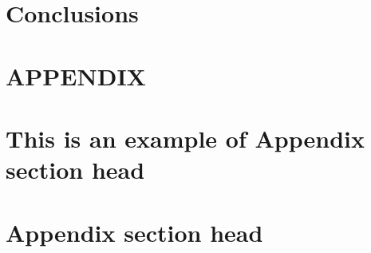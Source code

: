 \documentclass[prodmode,acmtecs]{acmsmall} %
\begin{document}
\section{Conclusions}


\appendix
\section*{APPENDIX}
\setcounter{section}{1}


\begin{acks}
\end{acks}





\elecappendix

\medskip

\section{This is an example of Appendix section head}


\section{Appendix section head}
\end{document}

